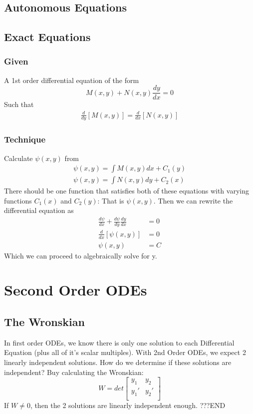 \documentclass[11pt]{article}
\begin{document}
\subsection{Autonomous Equations}
\subsection{Exact Equations}
\subsubsection{Given}
A 1st order differential equation of the form
    \[ M(x,y) + N(x,y)\frac{dy}{dx} = 0 \]
Such that
\begin{align*}
    \frac{d}{dy}[M(x,y)] = \frac{d}{dx}[ N(x,y)]
\end{align*}
\subsubsection{Technique}
Calculate $\psi (x,y)$ from
\begin{align*}
    \psi (x,y) = \int M(x,y)dx + C_1(y) \\
    \psi (x,y) = \int N(x,y)dy + C_2(x) 
\end{align*}
There should be one function that satisfies both of these equations with varying functions $C_1(x)$ and 
$C_2(y)$: That is $\psi (x,y)$. Then we can rewrite the differential equation as
\begin{align*}
\frac{d\psi}{dx} + \frac{d\psi}{dy}\frac{dy}{dx} &= 0 \\
\frac{d}{dx}[\psi (x,y)] &= 0\\
\psi (x,y) &= C
\end{align*}
Which we can proceed to algebraically solve for y.

\section{Second Order ODEs}
\subsection{The Wronskian}
In first order ODEs, we know there is only one solution to each Differential Equation (plus all of it's
scalar multiples). With 2nd Order ODEs, we expect 2 linearly independent solutions. How do we determine
if these solutions are independent? Buy calculating the Wronskian:
\[
    W = det\begin{bmatrix}
            y_1  & y_2 \\  
            y_1' & y_2'\\
            \end{bmatrix}
\]
If $ W \neq 0 $, then the 2 solutions are linearly independent enough. 
???END
\end{document}

